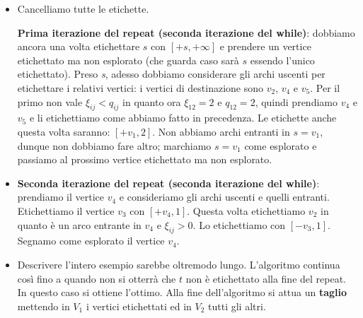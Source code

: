 \documentclass[11pt]{book}
\begin{document}
\begin{itemize}
\begin{itemize}
  \item {\bf Incremento del flusso - iterazione 2}: proseguiamo
    all'indietro e individuiamo $\xi_{23} = 2$ e lo scriviamo
    sull'arco. Assegniamo a $x$ il vertice $y=2$, dunque continuiamo a
    iterare.

  \item {\bf Incremento del flusso - iterazione 3}: troviamo $\xi_{12}
    = 2$, lo mettiamo sull'arco e poniamo $x = y = v_1$. Essendo $v_1
    = s$ l'iterazione per l'incremento del flusso \`e finita. 
  \end{itemize} 

\item Cancelliamo tutte le etichette.

{\bf Prima iterazione del repeat (seconda iterazione del while)}:
dobbiamo ancora una volta etichettare $s$ con $[+s,+\infty]$ e
prendere un vertice etichettato ma non esplorato (che guarda caso
sar\`a $s$ essendo l'unico etichettato). Preso {\em s}, adesso
dobbiamo considerare gli archi uscenti per etichettare i relativi
vertici: i vertici di destinazione sono $v_2$, $v_4$ e $v_5$. Per il
primo non vale $\xi_{ij} < q_{ij}$ in quanto ora $\xi_{12} = 2$ e
$q_{12} = 2$, quindi prendiamo $v_4$ e $v_5$ e li etichettiamo come
abbiamo fatto in precedenza. Le etichette anche questa volta saranno:
$[+v_1, 2]$. Non abbiamo archi entranti in $s = v_1$, dunque non
dobbiamo fare altro; marchiamo $s = v_1$ come esplorato e passiamo al
prossimo vertice etichettato ma non esplorato.

\item {\bf Seconda iterazione del repeat (seconda iterazione del
  while)}: prendiamo il vertice $v_4$ e consideriamo gli archi uscenti
  e quelli entranti. Etichettiamo il vertice $v_3$ con $[+v_4,
    1]$. Questa volta etichettiamo $v_2$ in quanto \`e un arco
  entrante in $v_4$ e $\xi_{ij} > 0$. Lo etichettiamo con $[-v_3,
    1]$. Segnamo come esplorato il vertice $v_4$. 

\item Descrivere l'intero esempio sarebbe oltremodo lungo. L'algoritmo
  continua cos\`i fino a quando non si otterr\`a che $t$ non \`e
  etichettato alla fine del repeat. In questo caso si ottiene
  l'ottimo. Alla fine dell'algoritmo si attua un {\bf taglio} mettendo
  in $V_1$ i vertici etichettati ed in $V_2$ tutti gli altri.


\end{itemize}
\end{document}

